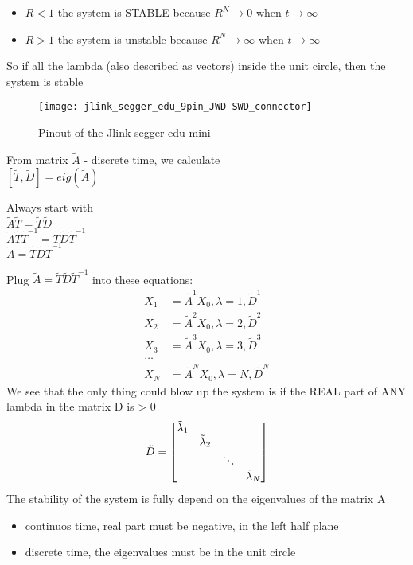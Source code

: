 \begin{itemize}
  \item $ R < 1 $ the system is STABLE because $R^N \rightarrow 0$ when $t \rightarrow \infty$
  \item $ R > 1 $ the system is unstable because $R^N \rightarrow \infty$ when $t \rightarrow \infty$
\end{itemize}
So if all the lambda (also described as vectors) inside the unit circle, then the system is stable
\begin{figure}[h]
  \texttt{[image: jlink\_segger\_edu\_9pin\_JWD-SWD\_connector]}
  \caption{Pinout of the Jlink segger edu mini}  
\end{figure}

From matrix $\tilde{A}$ - discrete time, we calculate
\\$[ \tilde{T} , \tilde{D}] = eig(\tilde{A})$

Always start with 
\\$ \tilde{A}\tilde{T} = \tilde{T}\tilde{D} $
\\$ \tilde{A}\tilde{T}{\tilde{T}}^{-1} = \tilde{T}\tilde{D}{\tilde{T}}^{-1} $
\\$ \tilde{A} = \tilde{T}\tilde{D}{\tilde{T}}^{-1} $

Plug $ \tilde{A} = \tilde{T}\tilde{D}{\tilde{T}}^{-1}$ into these equations:
\begin{equation}
  \begin{aligned}
    X_{1}  & = {\tilde{A}}^{1}X_{0}, \lambda = 1, {\tilde{D}}^{1}\\
    X_{2}  & = {\tilde{A}}^{2}X_{0}, \lambda = 2, {\tilde{D}}^{2}\\
    X_{3}  & = {\tilde{A}}^{3}X_{0}, \lambda = 3, {\tilde{D}}^{3}\\
    \ldots\\
    X_{N}  & = {\tilde{A}}^{N}X_{0}, \lambda = N, {\tilde{D}}^{N}
  \end{aligned}  
\end{equation} 
We see that the only thing could blow up the system is if the REAL part of ANY lambda in the matrix D is > 0
\begin{equation} 
  \tilde{D} = 
  \begin{bmatrix}
      $$\tilde{\lambda}_{1}$$ &  &  &\\ 
      & $$\tilde{\lambda}_{2}$$   &  &\\ 
      & & \ddots & \\ 
      & & & $$\tilde{\lambda}_{N}$$
  \end{bmatrix}
\end{equation}
The stability of the system is fully depend on the eigenvalues of the matrix A
\begin{itemize}
  \item continuos time, real part must be negative, in the left half plane
  \item discrete time, the eigenvalues must be in the unit circle
\end{itemize}


